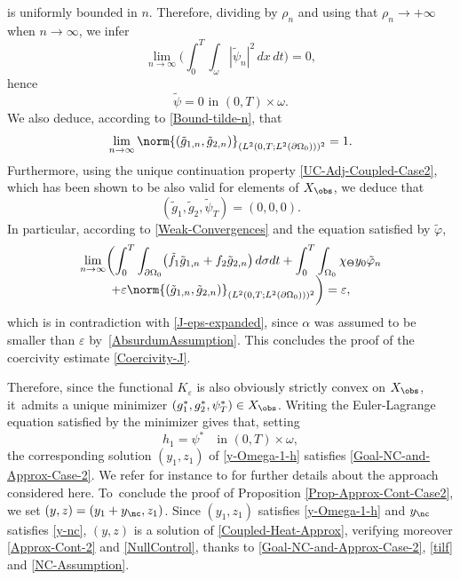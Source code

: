 is uniformly bounded in $n$. Therefore, dividing by $\rho_n$ and using that $\rho_n\to +\infty$ when $n\to \infty$, we infer
\begin{equation*}
\lim_{n \to \infty} \biggl(\int_0^T \int_\omega |\tilde \psi_n|^2 \, dx\,dt \biggr) = 0,
\end{equation*}
hence
\[
\tilde \psi = 0 \text{ in } (0,T) \times \omega.
\]
We also deduce, according to \eqref{Bound-tilde-n}, that
\begin{equation*}
\lim_{n \to \infty} \norm{(\tilde g_{1,n}, \tilde g_{2,n})}_{(L^2(0,T; L^2(\partial\Omega_0)))^2} = 1.
\end{equation*}
Furthermore, using the unique continuation property \eqref{UC-Adj-Coupled-Case2}, which has been shown to be also valid for elements of $X_{\obs}$, we deduce that
\[
(\tilde g_1, \tilde g_2, \tilde \psi_T) = (0,0,0).
\]
In particular, according to \eqref{Weak-Convergences} and the equation satisfied by $\tilde \varphi$,
\begin{multline*}
\lim_{n \to \infty}
\biggl(
\int_0^T \int_{\partial \Omega_0} \bigl(\tilde f_1 \tilde g_{1,n} + f_2 \tilde g_{2,n} \bigr) \, d\sigma dt
+
\int_0^T \int_{\Omega_0} \chi_{\Theta} y_0 \tilde \varphi_n\\[-5pt]
+
\varepsilon
{ \norm{(\tilde g_{1,n}, \tilde g_{2,n})}_{(L^2(0,T; L^2(\partial\Omega_0)))^2}}
\biggr)
=
\varepsilon,
\end{multline*}
which is in contradiction with \eqref{J-eps-expanded}{, since $\alpha$ was assumed to be smaller than $\varepsilon$ by~\eqref{AbsurdumAssumption}}. This concludes the proof of the coercivity estimate \eqref{Coercivity-J}.

Therefore, since the functional $K_\varepsilon$ is also obviously strictly convex on $X_{\obs}$, it~admits a unique minimizer $(g_1^*, g_2^*, \psi_T^*) \in X_{\obs}$. Writing the Euler-Lagrange equation satisfied by the minimizer gives that, setting
\begin{equation*}
h_1 = \psi^* \quad\text{in } (0,T) \times \omega,
\end{equation*}
the corresponding solution $(y_1,z_1)$ of \eqref{y-Omega-1-h} satisfies \eqref{Goal-NC-and-Approx-Case-2}. We refer for instance to \cite[Th.\,1.2 and its proof]{Ervedoza-Note-2020} for further details about the approach considered here. To~conclude the proof of Proposition \ref{Prop-Approx-Cont-Case2}, we set $(y,z)=(y_1+y_{\nc},z_1)$. Since $(y_1,z_1)$ satisfies \eqref{y-Omega-1-h} and $y_{\nc}$ satisfies \eqref{y-nc}, $(y,z)$ is a solution of \eqref{Coupled-Heat-Approx}, verifying moreover \eqref{Approx-Cont-2} and \eqref{NullControl}, thanks to \eqref{Goal-NC-and-Approx-Case-2}, \eqref{tilf} and \eqref{NC-Assumption}.

